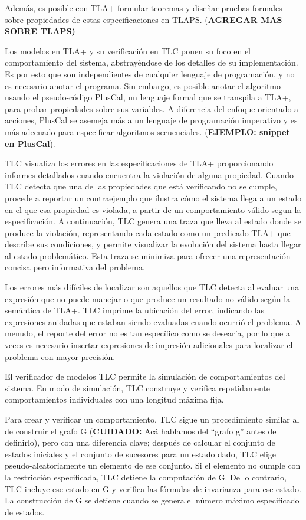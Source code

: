 \documentclass[runningheads]{llncs}
\begin{document}
Además, es posible con TLA+ formular teoremas y diseñar pruebas formales sobre propiedades de estas especificaciones en TLAPS. (\textbf{AGREGAR MAS SOBRE TLAPS)}

Los modelos en TLA+ y su verificación en TLC ponen su foco en el comportamiento del sistema, abstrayéndose de los detalles de su implementación. Es por esto que son independientes de cualquier lenguaje de programación, y no es necesario anotar el programa. Sin embargo, es posible anotar el algoritmo usando el pseudo-código PlusCal, un lenguaje formal que se transpila a TLA+, para probar propiedades sobre sus variables. A diferencia del enfoque orientado a acciones, PlusCal se asemeja más a un lenguaje de programación imperativo y es más adecuado para especificar algoritmos secuenciales. (\textbf{EJEMPLO: snippet en PlusCal}).

TLC visualiza los errores en las especificaciones de TLA+ proporcionando informes detallados cuando encuentra la violación de alguna propiedad. Cuando TLC detecta que una de las propiedades que está verificando no se cumple, procede a reportar un contraejemplo que ilustra cómo el sistema llega a un estado en el que esa propiedad es violada, a partir de un comportamiento válido segun la especificación. A continuación, TLC genera una traza que lleva al estado donde se produce la violación, representando cada estado como un predicado TLA+ que describe sus condiciones, y permite visualizar la evolución del sistema hasta llegar al estado problemático. Esta traza se minimiza para ofrecer una representación concisa pero informativa del problema. 

Los errores más difíciles de localizar son aquellos que TLC detecta al evaluar una expresión que no puede manejar o que produce un resultado no válido según la semántica de TLA+. TLC imprime la ubicación del error, indicando las expresiones anidadas que estaban siendo evaluadas cuando ocurrió el problema. A menudo, el reporte del error no es tan específico como se desearía, por lo que a veces es necesario insertar expresiones de impresión adicionales para localizar el problema con mayor precisión.

El verificador de modelos TLC permite la simulación de comportamientos del sistema. En modo de simulación, TLC construye y verifica repetidamente comportamientos individuales con una longitud máxima fija.

Para crear y verificar un comportamiento, TLC sigue un procedimiento similar al de construir el grafo G (\textbf{CUIDADO:} Acá hablamos del “grafo g” antes de definirlo), pero con una diferencia clave; después de calcular el conjunto de estados iniciales y el conjunto de sucesores para un estado dado, TLC elige pseudo-aleatoriamente un elemento de ese conjunto. Si el elemento no cumple con la restricción especificada, TLC detiene la computación de G. De lo contrario, TLC incluye ese estado en G y verifica las fórmulas de invarianza para ese estado. La construcción de G se detiene cuando se genera el número máximo especificado de estados.
\end{document}
